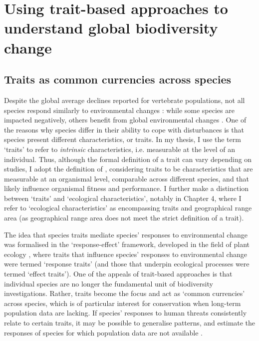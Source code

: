 \section{Using trait-based approaches to understand global biodiversity change}

\subsection{Traits as common currencies across species}

Despite the global average declines reported for vertebrate populations, not all species respond similarly to environmental changes \citep{Dornelas2019, Leung2020}: while some species are impacted negatively, others benefit from global environmental changes \citep{Thomas2013, Newbold2018a}. One of the reasons why species differ in their ability to cope with disturbances is that species present different characteristics, or traits. In my thesis, I use the term `traits' to refer to \textit{intrinsic} characteristics, i.e. measurable at the level of an individual. Thus, although the formal definition of a trait can vary depending on studies, I adopt the definition of \citet{McGill2006}, considering traits to be characteristics that are measurable at an organismal level, comparable across different species, and that likely influence organismal fitness and performance. I further make a distinction between `traits' and `ecological characteristics', notably in Chapter 4, where I refer to `ecological characteristics' as encompassing traits and geographical range area (as geographical range area does not meet the strict definition of a trait).

The idea that species traits mediate species' responses to environmental change was formalised in the `response-effect' framework, developed in the field of plant ecology \citep{Lavorel2002a}, where traits that influence species' responses to environmental change were termed `response traits' (and those that underpin ecological processes were termed `effect traits'). One of the appeals of trait-based approaches is that individual species are no longer the fundamental unit of biodiversity investigations. Rather, traits become the focus and act as `common currencies' across species, which is of particular interest for conservation when long-term population data are lacking. If species' responses to human threats consistently relate to certain traits, it may be possible to generalise patterns, and estimate the responses of species for which population data are not available \citep{Verberk2013}. 

